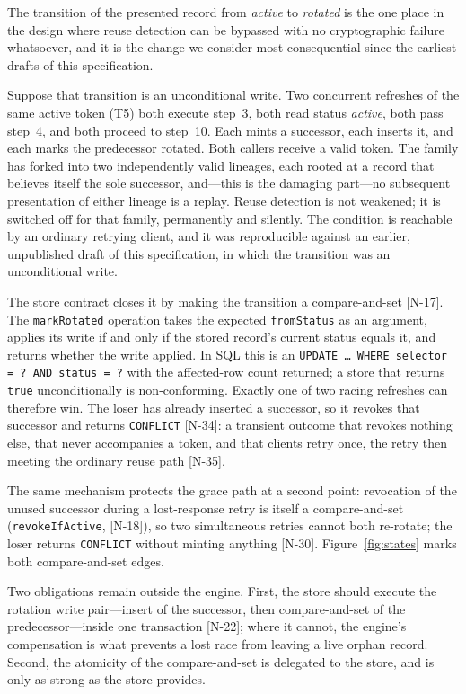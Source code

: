 \documentclass[11pt]{article}
\begin{document}
The transition of the presented record from \textit{active} to
\textit{rotated} is the one place in the design where reuse detection can be
bypassed with no cryptographic failure whatsoever, and it is the change we
consider most consequential since the earliest drafts of this specification.

Suppose that transition is an unconditional write. Two concurrent refreshes
of the same active token (T5) both execute step~3, both read status
\textit{active}, both pass step~4, and both proceed to step~10. Each mints a
successor, each inserts it, and each marks the predecessor rotated. Both
callers receive a valid token. The family has forked into two independently
valid lineages, each rooted at a record that believes itself the sole
successor, and---this is the damaging part---no subsequent presentation of
either lineage is a replay. Reuse detection is not weakened; it is switched
off for that family, permanently and silently. The condition is reachable by
an ordinary retrying client, and it was reproducible against an earlier,
unpublished draft of this specification, in which the transition was an
unconditional write.

The store contract closes it by making the transition a compare-and-set
[N-17]. The \texttt{markRotated} operation takes the expected
\texttt{fromStatus} as an argument, applies its write if and only if the
stored record's current status equals it, and returns whether the write
applied. In SQL this is an
\texttt{UPDATE \ldots{} WHERE selector = ? AND status = ?} with the
affected-row count returned; a store that returns \texttt{true}
unconditionally is non-conforming. Exactly one of two racing refreshes can
therefore win. The loser has already inserted a successor, so it revokes
that successor and returns \texttt{CONFLICT} [N-34]: a transient outcome
that revokes nothing else, that never accompanies a token, and that clients
retry once, the retry then meeting the ordinary reuse path [N-35].

The same mechanism protects the grace path at a second point: revocation of
the unused successor during a lost-response retry is itself a compare-and-set
(\texttt{revokeIfActive}, [N-18]), so two simultaneous retries cannot both
re-rotate; the loser returns \texttt{CONFLICT} without minting anything
[N-30]. Figure~\ref{fig:states} marks both compare-and-set edges.

Two obligations remain outside the engine. First, the store should execute
the rotation write pair---insert of the successor, then compare-and-set of
the predecessor---inside one transaction [N-22]; where it cannot, the
engine's compensation is what prevents a lost race from leaving a live
orphan record. Second, the atomicity of the compare-and-set is delegated to
the store, and is only as strong as the store provides.
\end{document}
